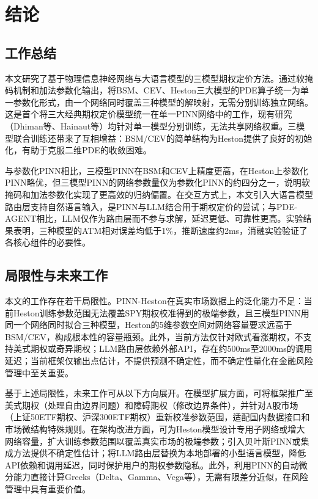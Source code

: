 \chapter{结论}\label{chap:conclusion}

\section{工作总结}\label{sec:comparison_related}

本文研究了基于物理信息神经网络与大语言模型的三模型期权定价方法。通过软掩码机制和加法参数化输出，将BSM、CEV、Heston三大模型的PDE算子统一为单一参数化形式，由一个网络同时覆盖三种模型的解映射，无需分别训练独立网络。这是首个将三大经典期权定价模型统一在单一PINN网络中的工作，现有研究（Dhiman等\cite{dhiman2023pinn}、Hainaut等\cite{hainaut2024heston}）均针对单一模型分别训练，无法共享网络权重。三模型联合训练还带来了互相增益：BSM/CEV的简单结构为Heston提供了良好的初始化，有助于克服二维PDE的收敛困难。

与参数化PINN相比，三模型PINN在BSM和CEV上精度更高，在Heston上参数化PINN略优，但三模型PINN的网络参数量仅为参数化PINN的约四分之一，说明软掩码和加法参数化实现了更高效的归纳偏置。在交互方式上，本文引入大语言模型路由层支持自然语言输入，是PINN与LLM结合用于期权定价的尝试；与PDE-AGENT\cite{liu2025pdeagent}相比，LLM仅作为路由层而不参与求解，延迟更低、可靠性更高。实验结果表明，三种模型的ATM相对误差均低于1\%，推断速度约2ms，消融实验验证了各核心组件的必要性。

\section{局限性与未来工作}\label{sec:limitations}

本文的工作存在若干局限性。PINN-Heston在真实市场数据上的泛化能力不足：当前Heston训练参数范围无法覆盖SPY期权校准得到的极端参数，且三模型PINN用同一个网络同时拟合三种模型，Heston的5维参数空间对网络容量要求远高于BSM/CEV，构成根本性的容量瓶颈。此外，当前方法仅针对欧式看涨期权，不支持美式期权或奇异期权；LLM路由层依赖外部API，存在约500ms至2000ms的调用延迟；当前框架仅输出点估计，不提供预测不确定性，而不确定性量化在金融风险管理中至关重要。

基于上述局限性，未来工作可从以下方向展开。在模型扩展方面，可将框架推广至美式期权（处理自由边界问题）和障碍期权（修改边界条件），并针对A股市场（上证50ETF期权、沪深300ETF期权）重新校准参数范围，适配国内数据接口和市场微结构特殊规则。在架构改进方面，可为Heston模型设计专用子网络或增大网络容量，扩大训练参数范围以覆盖真实市场的极端参数；引入贝叶斯PINN或集成方法提供不确定性估计；将LLM路由层替换为本地部署的小型语言模型，降低API依赖和调用延迟，同时保护用户的期权参数隐私。此外，利用PINN的自动微分能力直接计算Greeks（Delta、Gamma、Vega等），无需有限差分近似，在风险管理中具有重要价值。
